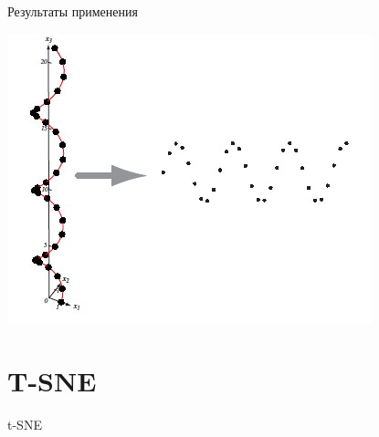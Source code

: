 \documentclass[10pt]{beamer}
\begin{document}
\begin{frame}{Результаты применения}

\begin{center}
\includegraphics[scale=0.6]{images/mds_result.png}
\end{center}

\end{frame}


\section{T-SNE}


\begin{frame}

\begin{center}
{\Large t-SNE}
\end{center}

\end{frame}
\end{document}
